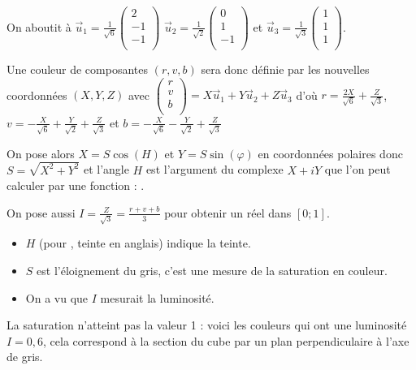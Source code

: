 On aboutit à $\displaystyle \vec u_1 = \frac 1{\sqrt 6}\begin{pmatrix} 2\\ -1\\ -1\\ \end{pmatrix}$ $\displaystyle \vec u_2 = \frac 1{\sqrt 2}\begin{pmatrix} 0\\ 1\\ -1\\ \end{pmatrix}$ et $\displaystyle \vec u_3 = \frac 1{\sqrt 3}\begin{pmatrix} 1\\ 1\\ 1\\ \end{pmatrix}$.

Une couleur de composantes $(r, v, b)$ sera donc définie par les nouvelles coordonnées $(X, Y, Z)$ avec 
$\displaystyle \begin{pmatrix} r\\ v\\ b\\ \end{pmatrix}
=X  \vec u_1+Y \vec u_2+ Z\vec u_3$ 
d'où $\displaystyle r = \frac {2X}{\sqrt 6} + \frac Z{\sqrt 3}$, $\displaystyle v = -\frac {X}{\sqrt 6} + \frac Y{\sqrt 2}+\frac Z{\sqrt 3}$ et  $\displaystyle b = -\frac {X}{\sqrt 6} - \frac Y{\sqrt 2}+\frac Z{\sqrt 3}$


On pose alors $X =S\cos(H)$ et $Y=S\sin(\varphi)$ en coordonnées polaires donc $S=\sqrt{X^2+Y^2}$ et l'angle $H$ est l'argument du complexe $X+iY$ que l'on peut calculer par une fonction  : .

On pose aussi $\displaystyle I = \frac Z{\sqrt 3} =\frac {r+v+b}{3}$ pour obtenir un réel dans $[0;1]$.
\begin{itemize}
\item $H $ (pour , teinte en anglais) indique la teinte. 
\item $S$ est l'éloignement du gris, c'est une mesure de la saturation en couleur.
 
\item On a vu que $I$ mesurait la luminosité.
\end{itemize}

La saturation n'atteint pas la valeur 1 : voici les couleurs qui ont une luminosité $I = 0,6$, cela correspond à la section du cube par un plan perpendiculaire à l'axe de gris.

